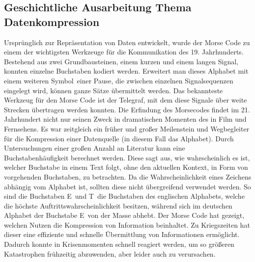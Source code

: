 \subsection{Geschichtliche Ausarbeitung Thema Datenkompression}
\label{subsec:main_kompression}
Ursprünglich zur Repräsentation von Daten entwickelt, wurde der Morse Code zu einem der wichtigsten Werkzeuge für die Kommunikation des 19. Jahrhunderts. 
Bestehend aus zwei Grundbausteinen, einem kurzen und einem langen Signal, konnten einzelne Buchstaben kodiert werden. 
Erweitert man dieses Alphabet mit einem weiteren \glqq Symbol\grqq\, einer Pause, die zwischen einzelnen Signalsequenzen eingelegt wird, können ganze Sätze übermittelt werden. 
Das bekannteste Werkzeug für den Morse Code ist der Telegraf, mit dem diese Signale über weite Strecken übertragen werden konnten.
Die Erfindung des Morsecodes findet im 21. Jahrhundert nicht nur seinen Zweck in dramatischen Momenten des in Film und Fernsehens. 
Es war zeitgleich ein früher und großer Meilenstein und Wegbegleiter für die Kompression einer Datenquelle (in diesem Fall das Alphabet). 
Durch Untersuchungen einer großen Anzahl an Literatur kann eine Buchstabenhäufigkeit berechnet werden. 
Diese sagt aus, wie wahrscheinlich es ist, welcher Buchstabe in einem Text folgt, ohne den aktuellen Kontext, in Form von vorgehenden Buchstaben, zu betrachten.
Da die Wahrscheinlichkeit eines Zeichens abhängig vom Alphabet ist, sollten diese nicht übergreifend verwendet werden. 
So sind die Buchstaben \glqq E\grqq\ und \glqq T\grqq\ die Buchstaben des englischen Alphabets, welche die höchste Auftrittswahrscheinlichkeit besitzen, während sich im deutschen Alphabet der Buchstabe \glqq E\grqq\ von der Masse abhebt.
Der Morse Code hat gezeigt, welchen Nutzen die Kompression von Information beinhaltet.
Zu Kriegszeiten hat dieser eine effiziente und schnelle Übermittlung von Informationen ermöglicht.
Dadurch konnte in Krisenmomenten schnell reagiert werden, um so größeren Katastrophen frühzeitig abzuwenden, aber leider auch zu verursachen.

